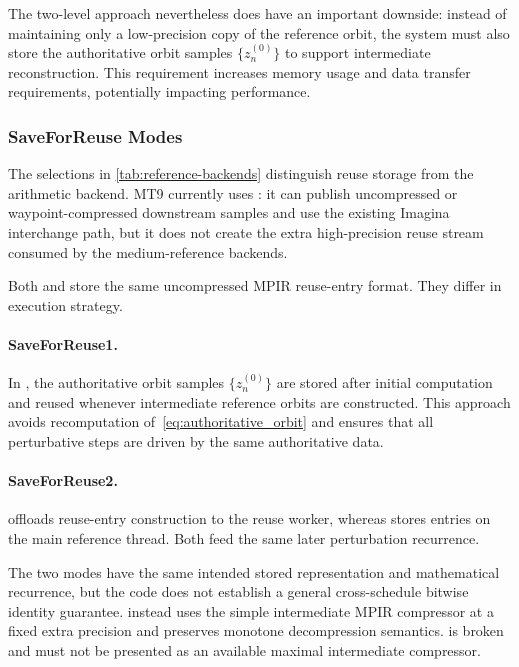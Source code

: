 The two-level approach nevertheless does have an important downside: instead of
maintaining only a low-precision copy of the reference orbit, the system must also
store the authoritative orbit samples $\{z^{(0)}_n\}$ to support intermediate
reconstruction.  This requirement increases memory usage and data transfer requirements,
potentially impacting performance.

\subsubsection{SaveForReuse Modes}

The selections in \cref{tab:reference-backends} distinguish reuse storage
from the arithmetic backend. MT9 currently uses :
it can publish uncompressed or waypoint-compressed downstream samples and
use the existing Imagina interchange path, but it does not create the extra
high-precision reuse stream consumed by the medium-reference backends.

Both  and  store the same uncompressed
MPIR reuse-entry format.  They differ in execution strategy.

\paragraph{SaveForReuse1.}
In , the authoritative orbit samples $\{z^{(0)}_n\}$ are stored after initial computation and reused
whenever intermediate reference orbits are constructed.
This approach avoids recomputation of~\eqref{eq:authoritative_orbit} and ensures that all perturbative steps are driven by the same
authoritative data.

\paragraph{SaveForReuse2.}
 offloads reuse-entry construction to the reuse worker,
whereas  stores entries on the main reference thread.  Both
feed the same later perturbation recurrence.

The two modes have the same intended stored representation and mathematical
recurrence, but the code does not establish a general cross-schedule bitwise
identity guarantee.   instead uses the simple intermediate
MPIR compressor at a fixed extra precision and preserves monotone decompression
semantics.   is broken and must not be presented as an
available maximal intermediate compressor.


